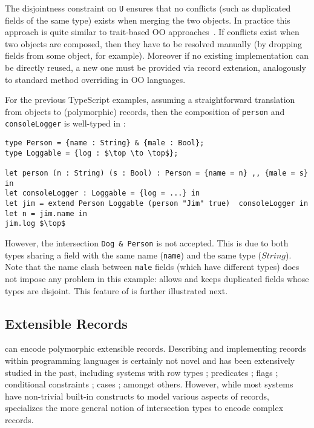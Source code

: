 \noindent The disjointness constraint on \lstinline{U} ensures that no
conflicts (such as duplicated fields of the same type) exists when merging the two objects. In practice this approach
is quite similar to trait-based OO approaches~\cite{scharli2003traits}. If conflicts
exist when two objects are composed, then they have to be resolved
manually (by dropping fields from some object, for example). Moreover if no existing
implementation can be directly reused, a new one must be provided via
record extension, analogously to standard method overriding in OO
languages.

For the previous TypeScript examples, assuming a straightforward
translation from objects to (polymorphic) records, then the
composition of \lstinline{person} and \lstinline{consoleLogger} is
well-typed in \name:

\begin{lstlisting}[mathescape=true]
type Person = {name : String} & {male : Bool};
type Loggable = {log : $\top \to \top$};

let person (n : String) (s : Bool) : Person = {name = n} ,, {male = s} in
let consoleLogger : Loggable = {log = ...} in
let jim = extend Person Loggable (person "Jim" true)  consoleLogger in
let n = jim.name in
jim.log $\top$
\end{lstlisting}

However, the intersection \lstinline$Dog & Person$ is not accepted.
This is due to both types sharing a field with the same name (\lstinline$name$) 
and the same type ($String$).
Note that the name clash between \lstinline$male$ fields (which have
different types) does not impose any 
problem in this example: \name allows and keeps duplicated fields
whose types are disjoint. This feature of \name is further illustrated next.

\subsection{Extensible Records}
\name can encode polymorphic extensible records. Describing and
implementing records within programming languages is certainly not
novel and has been extensively studied in the past, including
systems with row types \cite{wand1987complete,wand1989type}; 
predicates \cite{harper1990extensible,harper1991record,gaster1996polymorphic}; 
flags \cite{remy1993type}; conditional constraints \cite{pottier2003constraint};
cases \cite{blume2006extensible}; amongst others. However, while 
most systems have non-trivial built-in constructs to model various aspects of
records, \name specializes the more general notion of intersection
types to encode complex records.

